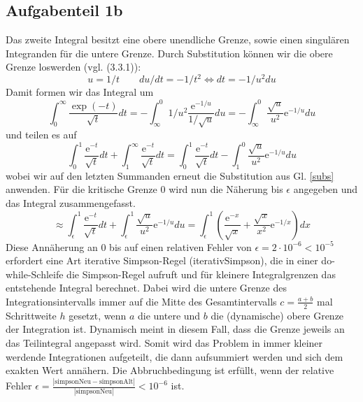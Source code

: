 \subsection*{Aufgabenteil 1b}
Das zweite Integral besitzt eine obere unendliche Grenze, sowie einen singulären Integranden für die untere Grenze.
Durch Substitution können wir die obere Grenze loswerden (vgl. (3.3.1)\cite[37]{script}):
\begin{equation}
u = 1/t \qquad du/dt = - 1/t^2 \Leftrightarrow dt = -1/u^2 du
\label{subs}
\end{equation}
Damit formen wir das Integral um
\begin{equation*}
\int_0^{\infty} \frac{\exp(-t)}{\sqrt{t}}dt = - \int_{\infty}^0 1/u^2 \frac{\mathup{e}^{-1/u}}{1/\sqrt{u}} du= - \int_{\infty}^0 \frac{\sqrt{u}}{u^2} \mathup{e}^{-1/u} du
\end{equation*}
und teilen es auf
\begin{equation*}
\int_0^1 \frac{\mathup{e}^{-t}}{\sqrt{t}} dt + \int_1^{\infty} \frac{\mathup{e}^{-t}}{\sqrt{t}}dt = \int_0^1 \frac{\mathup{e}^{-t}}{\sqrt{t}} dt - \int_{1}^0 \frac{\sqrt{u}}{u^2} \mathup{e}^{-1/u} du
\end{equation*}
wobei wir auf den letzten Summanden erneut die Substitution aus Gl. \eqref{subs} anwenden. Für die kritische Grenze 0 wird nun die Näherung bis $\epsilon$ angegeben und das Integral zusammengefasst.
\begin{equation*}
\approx \int_{\epsilon}^1 \frac{\mathup{e}^{-t}}{\sqrt{t}} dt+ \int_{\epsilon}^1 \frac{\sqrt{u}}{u^2} \mathup{e}^{-1/u} du = \int_{\epsilon}^1 \left(\frac{\mathup{e}^{-x}}{\sqrt{x}}+ \frac{\sqrt{x}}{x^2} \mathup{e}^{-1/x}\right) dx
\end{equation*}
Diese Annäherung an 0 bis auf einen relativen Fehler von $\epsilon = 2 \cdot 10^{-6} < 10^{-5}$ erfordert eine Art iterative Simpson-Regel (iterativSimpson), die in einer do-while-Schleife die Simpson-Regel aufruft und für kleinere Integralgrenzen das entstehende Integral berechnet. Dabei wird die untere Grenze des Integrationsintervalls immer auf die Mitte des Gesamtintervalls $c = \frac{a+b}{2}$ mal Schrittweite $h$ gesetzt, wenn $a$ die untere und $b$ die (dynamische) obere Grenze der Integration ist. Dynamisch meint in diesem Fall, dass die Grenze jeweils an das Teilintegral angepasst wird. Somit wird das Problem in immer kleiner werdende Integrationen aufgeteilt, die dann aufsummiert werden und sich dem exakten Wert annähern.
Die Abbruchbedingung ist erfüllt, wenn der relative Fehler $\epsilon = \frac{|\text{simpsonNeu}-\text{simpsonAlt}|}{|\text{simpsonNeu}|} < 10^{-6}$ ist.

